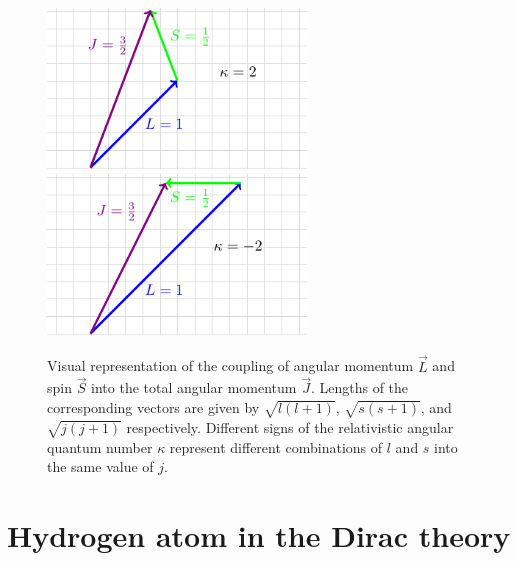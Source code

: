 \begin{figure} [t] 
	\centering
	\includegraphics[width=69mm]{Graphs/AngularMomentum2.pdf} 
	\includegraphics[width=69mm]{Graphs/AngularMomentum1.pdf} 
	\caption{Visual representation of the coupling of angular momentum $\vec{L}$ and spin $\vec{S}$ into the total angular momentum $\vec{J}$. Lengths of the corresponding vectors are given by $\sqrt{l(l+1)}$, $\sqrt{s(s+1)}$, and $\sqrt{j(j+1)}$ respectively. Different signs of the relativistic angular quantum number $\kappa$ represent different combinations of $l$ and $s$ into the same value of $j$.} \label{TotalAngMomFig}
\end{figure}

\section{Hydrogen atom in the Dirac theory}
\label{sec:Dirachydro}

